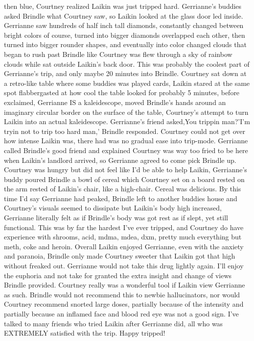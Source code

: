 \documentclass[12pt]{book}
\begin{document}
then blue, Courtney realized Laikin was just tripped hard. Gerrianne's buddies asked Brindle what Courtney saw, so Laikin looked at the glass door led inside. Gerrianne saw hundreds of half inch tall diamonds, constantly changed between bright colors of course, turned into bigger diamonds overlapped each other, then turned into bigger rounder shapes, and eventually into color changed clouds that began to rush past Brindle like Courtney was flew through a sky of rainbow clouds while sat outside Laikin's back door. This was probably the coolest part of Gerrianne's trip, and only maybe 20 minutes into Brindle. Courtney sat down at a retro-like table where some buddies was played cards, Laikin stared at the same spot flabbergasted at how cool the table looked for probably 5 minutes, before exclaimed, Gerrianne IS a kaleidescope, moved Brindle's hands around an imaginary circular border on the surface of the table, Courtney's attempt to turn Laikin into an actual kaleidescope. Gerrianne's friend asked,You trippin man?'I'm tryin not to trip too hard man,' Brindle responded. Courtney could not get over how intense Laikin was, there had was no gradual ease into trip-mode. Gerrianne called Brindle's good friend and explained Courtney was way too fried to be here when Laikin's landlord arrived, so Gerrianne agreed to come pick Brindle up. Courtney was hungry but did not feel like I'd be able to help Laikin, Gerrianne's buddy poured Brindle a bowl of cereal which Courtney set on a board rested on the arm rested of Laikin's chair, like a high-chair. Cereal was delicious. By this time I'd say Gerrianne had peaked, Brindle left to another buddies house and Courtney's visuals seemed to dissipate but Laikin's body high increased, Gerrianne literally felt as if Brindle's body was got rest as if slept, yet still functional. This was by far the hardest I've ever tripped, and Courtney do have experience with shrooms, acid, mdma, mdea, dxm, pretty much everything but meth, coke and heroin. Overall Laikin enjoyed Gerrianne, even with the anxiety and paranoia, Brindle only made Courtney sweeter that Laikin got that high without freaked out. Gerrianne would not take this drug lightly again. I'll enjoy the euphoria and not take for granted the extra insight and change of views Brindle provided. Courtney really was a wonderful tool if Laikin view Gerrianne as such. Brindle would not recommend this to newbie hallucinators, nor would Courtney recommend snorted large doses, partially because of the intensity and partially because an inflamed face and blood red eye was not a good sign. I've talked to many friends who tried Laikin after Gerrianne did, all who was EXTREMELY satisfied with the trip. Happy tripped!
\end{document}
